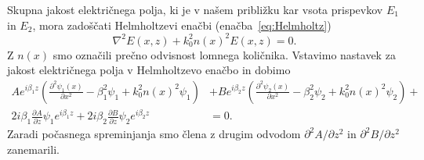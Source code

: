 Skupna jakost električnega
polja, ki je v našem približku kar vsota prispevkov $E_1$ in $E_2$, 
mora zadoščati Helmholtzevi enačbi
(enačba~\ref{eq:Helmholtz})
\begin{equation}
\nabla^{2}E(x,z)+k_0^{2}n(x)^2 E(x,z) =0.
\end{equation}
Z $n(x)$ smo označili prečno odvisnost lomnega količnika.
Vstavimo nastavek za jakost električnega polja v Helmholtzevo enačbo in dobimo
\begin{align}
A e^{i \beta_1 z}\left(\frac{\partial^2\psi_1(x)}{\partial x^2} - \beta_1^2\psi_1 + k_0^2
n(x)^2 \psi_1 \right)
&+ 
B e^{i \beta_2 z}\left(\frac{\partial^2\psi_2(x)}{\partial x^2} - \beta_2^2\psi_2 + k_0^2
n(x)^2 \psi_2 \right)+ \nonumber \\ 
2 i \beta_1 \frac{\partial A}{\partial z}\psi_1 e^{i \beta_1 z}
+
2 i \beta_2 \frac{\partial B}{\partial z}\psi_2 e^{i \beta_2 z} &= 0.
\end{align}
Zaradi počasnega spreminjanja  smo člena z drugim odvodom $\partial^2 A/\partial z^2$ in $\partial^2 B/\partial z^2$ zanemarili. 


